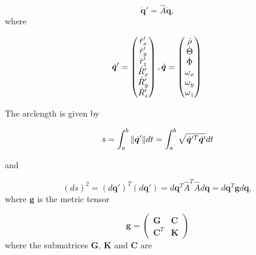 \documentclass{article}
\begin{document}
\begin{equation}
	\dot{\bm{q}}' = \hat{A}\dot{\bm{q}},
\end{equation} 
where     
     
\begin{equation}
\dot{\bm{q}}' =
\begin{pmatrix}
\dot{r}'_x \\
\dot{r}'_y \\
\dot{r}'_z \\
\dot{R}'_x \\
\dot{R}'_y \\
\dot{R}'_z\\
\end{pmatrix},
\dot{\bm{q}} =
\begin{pmatrix}
\dot{\rho}\\
\dot{\Theta}\\
\dot{\Phi}\\
\omega_x\\
\omega_y\\
\omega_z\\
\end{pmatrix} \notag \\
\end{equation}

     
The arclength is given by

\begin{equation}
s = \int_{a}^{b} \| \dot{\bm{q}}' \| dt = \int_{a}^{b} \sqrt{ \dot{\bm{q}}'^{T} \dot{\bm{q}}'}\\ dt
\end{equation}

and

\begin{equation}
(ds)^2 = (d\bm{q}')^{T}(d\bm{q}') = d\bm{q}^{T} \hat{A}^{T} \hat{A}d\bm{q} = d\bm{q}^{T} \bm{g} d\bm{q},
\end{equation}
where $\bm{g}$ is the metric tensor

\begin{equation}
\bm{g}=
\begin{pmatrix}
\bm{G} & \bm{C}\\
\bm{C}^T & \bm{K}
\end{pmatrix}
\end{equation}
where the submatrices $\bm{G}$, $\bm{K}$ and $\bm{C}$ are 
\end{document}
